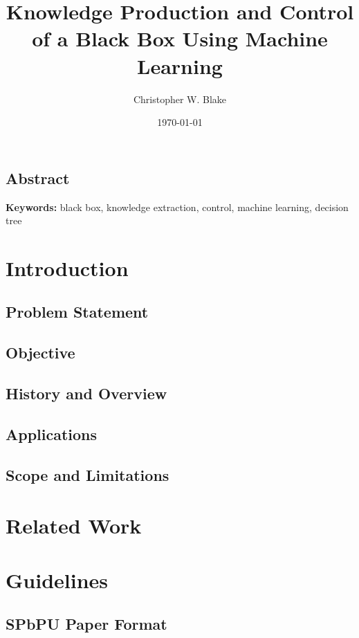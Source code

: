 \documentclass[a4paper,twoside,12pt]{book}
\title{Knowledge Production and Control of a Black Box Using Machine Learning}
\author{Christopher W. Blake}
\date{\today}
\newcommand{\keywords}{black box, knowledge extraction, control, machine learning, decision tree}
\begin{document}
	\makeatletter
	\@openrightfalse
	\makeatother

	

	\frontmatter \pagestyle{frontmatter}
		
		\section*{Abstract}
			 \linebreak
			\linebreak
			\textbf{Keywords: }\keywords
		\tableofcontents
		\listoffigures
		\listoftables
		\listofalgorithms

	\mainmatter \pagestyle{mainmatter}
		\chapter{Introduction} 
			\section{Problem Statement} 
			\section{Objective} 
			\section{History and Overview} 
			\section{Applications}  
			\section{Scope and Limitations} 
		\chapter{Related Work} 
		\chapter{Guidelines} 
			\section{SPbPU Paper Format}  
\end{document}
